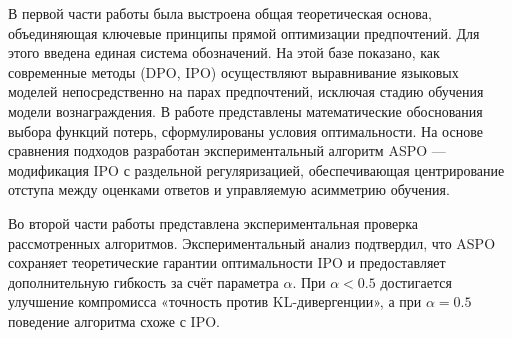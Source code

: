 \documentclass[a4paper,12pt]{article}
\begin{document}
В первой части работы была выстроена общая теоретическая основа, объединяющая ключевые принципы прямой оптимизации предпочтений. Для этого введена единая система обозначений. На этой базе показано, как современные методы (DPO, IPO) осуществляют выравнивание языковых моделей непосредственно на парах предпочтений, исключая стадию обучения модели вознаграждения. В работе представлены математические обоснования выбора функций потерь, сформулированы условия оптимальности. На основе сравнения подходов разработан экспериментальный алгоритм ASPO — модификация IPO с раздельной регуляризацией, обеспечивающая центрирование отступа между оценками ответов и управляемую асимметрию обучения.

Во второй части работы представлена экспериментальная проверка рассмотренных алгоритмов. Экспериментальный анализ подтвердил, что ASPO сохраняет теоретические гарантии оптимальности IPO и предоставляет дополнительную гибкость за счёт параметра $\alpha$. При $\alpha < 0.5$ достигается улучшение компромисса «точность против KL-дивергенции», а при $\alpha = 0.5$ поведение алгоритма схоже с IPO.
\end{document}

